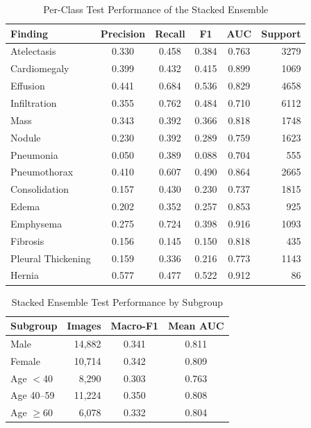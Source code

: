 \begin{table}[t]
\caption{Per-Class Test Performance of the Stacked Ensemble}
\label{tab:perclass}
\centering
\footnotesize
\setlength{\tabcolsep}{4pt}
\begin{tabular}{lccccr}
\toprule
Finding & Precision & Recall & F1 & AUC & Support \\
\midrule
Atelectasis & 0.330 & 0.458 & 0.384 & 0.763 & 3279 \\
Cardiomegaly & 0.399 & 0.432 & 0.415 & 0.899 & 1069 \\
Effusion & 0.441 & 0.684 & 0.536 & 0.829 & 4658 \\
Infiltration & 0.355 & 0.762 & 0.484 & 0.710 & 6112 \\
Mass & 0.343 & 0.392 & 0.366 & 0.818 & 1748 \\
Nodule & 0.230 & 0.392 & 0.289 & 0.759 & 1623 \\
Pneumonia & 0.050 & 0.389 & 0.088 & 0.704 & 555 \\
Pneumothorax & 0.410 & 0.607 & 0.490 & 0.864 & 2665 \\
Consolidation & 0.157 & 0.430 & 0.230 & 0.737 & 1815 \\
Edema & 0.202 & 0.352 & 0.257 & 0.853 & 925 \\
Emphysema & 0.275 & 0.724 & 0.398 & 0.916 & 1093 \\
Fibrosis & 0.156 & 0.145 & 0.150 & 0.818 & 435 \\
Pleural Thickening & 0.159 & 0.336 & 0.216 & 0.773 & 1143 \\
Hernia & 0.577 & 0.477 & 0.522 & 0.912 & 86 \\
\bottomrule
\end{tabular}
\end{table}

\begin{table}[t]
\caption{Stacked Ensemble Test Performance by Subgroup}
\label{tab:subgroups}
\centering
\begin{tabular}{lrcc}
\toprule
Subgroup & Images & Macro-F1 & Mean AUC \\
\midrule
Male & 14,882 & 0.341 & 0.811 \\
Female & 10,714 & 0.342 & 0.809 \\
Age $<$40 & 8,290 & 0.303 & 0.763 \\
Age 40--59 & 11,224 & 0.350 & 0.808 \\
Age $\geq$60 & 6,078 & 0.332 & 0.804 \\
\bottomrule
\end{tabular}
\end{table}

